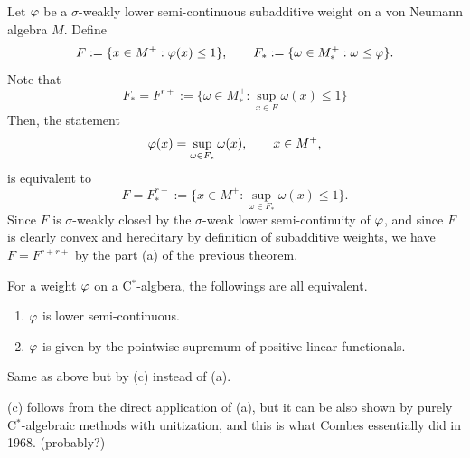 \documentclass{../../../../small}
\begin{document}
\begin{pf}
Let $\varphi$ be a $\sigma$-weakly lower semi-continuous subadditive weight on a von Neumann algebra $M$.
Define
\[F:=\{x\in M^+:\varphi(x)\le1\},\qquad F_*:=\{\omega\in M_*^+:\omega\le\varphi\}.\]
Note that
\[F_*=F^{r+}:=\{\omega\in M_*^+:\sup_{x\in F}\omega(x)\le1\}\]
Then, the statement
\[\varphi(x)=\sup_{\omega\in F_*}\omega(x),\qquad x\in M^+,\]
is equivalent to
\[F=F_*^{r+}:=\{x\in M^+:\sup_{\omega\in F_*}\omega(x)\le1\}.\]
Since $F$ is $\sigma$-weakly closed by the $\sigma$-weak lower semi-continuity of $\varphi$, and since $F$ is clearly convex and hereditary by definition of subadditive weights, we have $F=F^{r+r+}$ by the part (a) of the previous theorem.
\end{pf}



\begin{cor*}[Combes, 1968]
For a weight $\varphi$ on a C$^*$-algbera, the followings are all equivalent.
\begin{enumerate}
\item[(3)] $\varphi$ is lower semi-continuous.
\item[(4)] $\varphi$ is given by the pointwise supremum of positive linear functionals.
\end{enumerate}
\end{cor*}
\begin{pf}
Same as above but by (c) instead of (a).
\end{pf}


\begin{rmk*}
(c) follows from the direct application of (a), but it can be also shown by purely C$^*$-algebraic methods with unitization, and this is what Combes essentially did in 1968. (probably?)
\end{rmk*}
\end{document}
